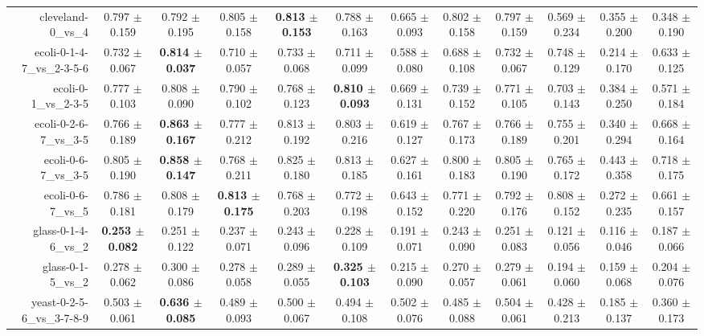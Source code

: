 \begin{table}[!ht]
{\begin{tabular}{r c c c c c c c c c c c}
cleveland-0\_vs\_4 & 0.797 $\pm$ 0.159 & 0.792 $\pm$ 0.195 & 0.805 $\pm$ 0.158 & \textbf{0.813 $\pm$ 0.153} & 0.788 $\pm$ 0.163 & 0.665 $\pm$ 0.093 & 0.802 $\pm$ 0.158 & 0.797 $\pm$ 0.159 & 0.569 $\pm$ 0.234 & 0.355 $\pm$ 0.200 & 0.348 $\pm$ 0.190 \\
ecoli-0-1-4-7\_vs\_2-3-5-6 & 0.732 $\pm$ 0.067 & \textbf{0.814 $\pm$ 0.037} & 0.710 $\pm$ 0.057 & 0.733 $\pm$ 0.068 & 0.711 $\pm$ 0.099 & 0.588 $\pm$ 0.080 & 0.688 $\pm$ 0.108 & 0.732 $\pm$ 0.067 & 0.748 $\pm$ 0.129 & 0.214 $\pm$ 0.170 & 0.633 $\pm$ 0.125 \\
ecoli-0-1\_vs\_2-3-5 & 0.777 $\pm$ 0.103 & 0.808 $\pm$ 0.090 & 0.790 $\pm$ 0.102 & 0.768 $\pm$ 0.123 & \textbf{0.810 $\pm$ 0.093} & 0.669 $\pm$ 0.131 & 0.739 $\pm$ 0.152 & 0.771 $\pm$ 0.105 & 0.703 $\pm$ 0.143 & 0.384 $\pm$ 0.250 & 0.571 $\pm$ 0.184 \\
ecoli-0-2-6-7\_vs\_3-5 & 0.766 $\pm$ 0.189 & \textbf{0.863 $\pm$ 0.167} & 0.777 $\pm$ 0.212 & 0.813 $\pm$ 0.192 & 0.803 $\pm$ 0.216 & 0.619 $\pm$ 0.127 & 0.767 $\pm$ 0.173 & 0.766 $\pm$ 0.189 & 0.755 $\pm$ 0.201 & 0.340 $\pm$ 0.294 & 0.668 $\pm$ 0.164 \\
ecoli-0-6-7\_vs\_3-5 & 0.805 $\pm$ 0.190 & \textbf{0.858 $\pm$ 0.147} & 0.768 $\pm$ 0.211 & 0.825 $\pm$ 0.180 & 0.813 $\pm$ 0.185 & 0.627 $\pm$ 0.161 & 0.800 $\pm$ 0.183 & 0.805 $\pm$ 0.190 & 0.765 $\pm$ 0.172 & 0.443 $\pm$ 0.358 & 0.718 $\pm$ 0.175 \\
ecoli-0-6-7\_vs\_5 & 0.786 $\pm$ 0.181 & 0.808 $\pm$ 0.179 & \textbf{0.813 $\pm$ 0.175} & 0.768 $\pm$ 0.203 & 0.772 $\pm$ 0.198 & 0.643 $\pm$ 0.152 & 0.771 $\pm$ 0.220 & 0.792 $\pm$ 0.176 & 0.808 $\pm$ 0.152 & 0.272 $\pm$ 0.235 & 0.661 $\pm$ 0.157 \\
glass-0-1-4-6\_vs\_2 & \textbf{0.253 $\pm$ 0.082} & 0.251 $\pm$ 0.122 & 0.237 $\pm$ 0.071 & 0.243 $\pm$ 0.096 & 0.228 $\pm$ 0.109 & 0.191 $\pm$ 0.071 & 0.243 $\pm$ 0.090 & 0.251 $\pm$ 0.083 & 0.121 $\pm$ 0.056 & 0.116 $\pm$ 0.046 & 0.187 $\pm$ 0.066 \\
glass-0-1-5\_vs\_2 & 0.278 $\pm$ 0.062 & 0.300 $\pm$ 0.086 & 0.278 $\pm$ 0.058 & 0.289 $\pm$ 0.055 & \textbf{0.325 $\pm$ 0.103} & 0.215 $\pm$ 0.090 & 0.270 $\pm$ 0.057 & 0.279 $\pm$ 0.061 & 0.194 $\pm$ 0.060 & 0.159 $\pm$ 0.068 & 0.204 $\pm$ 0.076 \\
yeast-0-2-5-6\_vs\_3-7-8-9 & 0.503 $\pm$ 0.061 & \textbf{0.636 $\pm$ 0.085} & 0.489 $\pm$ 0.093 & 0.500 $\pm$ 0.067 & 0.494 $\pm$ 0.108 & 0.502 $\pm$ 0.076 & 0.485 $\pm$ 0.088 & 0.504 $\pm$ 0.061 & 0.428 $\pm$ 0.213 & 0.185 $\pm$ 0.137 & 0.360 $\pm$ 0.173 \\

\end{tabular}}
\end{table}
